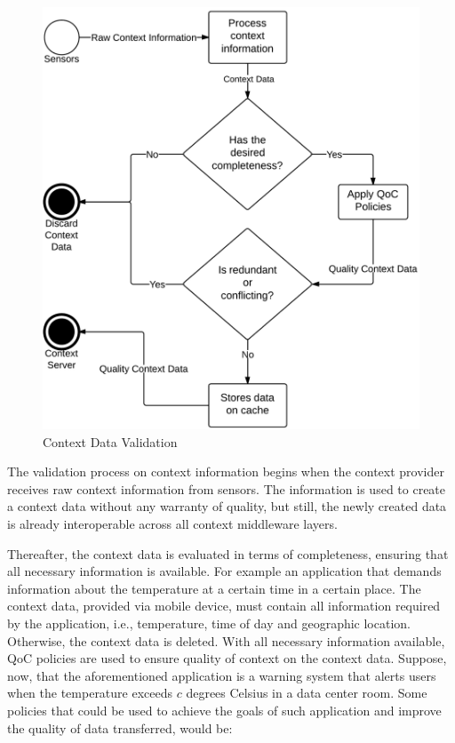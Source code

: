\documentclass[letterpaper,conference]{IEEEtran}
\begin{document}
  \begin{figure}[!ht]
  \centering
  \includegraphics[scale=0.13]{imagens/ContextValidationProcess}
  \caption{Context Data Validation}
  \label{validcontext}
 \end{figure}

 The validation process on context information begins when the context provider receives 
 raw context information from sensors. The information is used to create a context data 
 without any warranty of quality, but still, the newly created data is already 
 interoperable across all context middleware layers.

 Thereafter, the context data is evaluated in terms of completeness, ensuring that all 
 necessary information is available. For example an application that demands information
 about the temperature at a certain time in a certain place. The context data, provided
 via mobile device, must contain all information required by the application, i.e., 
 temperature, time of day and geographic location. Otherwise, the context data is 
 deleted. With all necessary information available, QoC policies are used to ensure 
 quality of context on the context data. Suppose, now, that the aforementioned 
 application is a warning system that alerts users when the temperature exceeds $c$ 
 degrees Celsius in a data center room. Some policies that could be used to achieve 
 the goals of such application and improve the quality of data transferred, would be:
 
\end{document}

